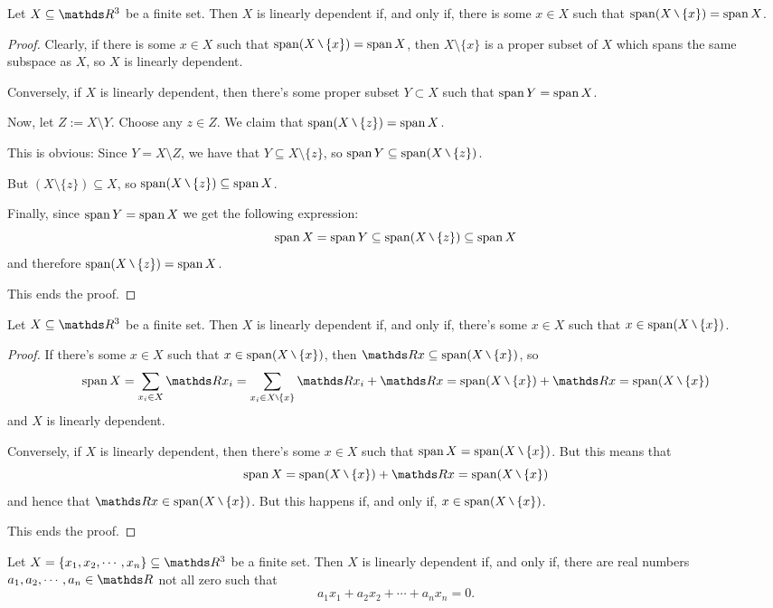 \begin{lemma}
	Let $X\subseteq \R^3$ be a finite set. Then $X$ is linearly dependent if, and only if, there is some $x\in X$ such that $\spen(X\setminus\{x\})=\spen X$.
\end{lemma}
\begin{proof}
	Clearly, if there is some $x\in X$ such that $\spen(X\setminus\{x\})=\spen X$, then $X\setminus\{x\}$ is a proper subset of $X$ which spans the same subspace as $X$, so $X$ is linearly dependent.
	
	\bigskip
	Conversely, if $X$ is linearly dependent, then there's some proper subset $Y\subset X$ such that $\operatorname{span} Y=\operatorname{span} X$.
	
	Now, let $Z:=X\setminus Y$. Choose any $z\in Z$. We claim that $\spen (X\setminus \{z\})=\spen X$.
	
	This is obvious: Since $Y=X\setminus Z$, we have that $Y\subseteq X\setminus \{z\}$, so $\spen Y\subseteq \spen(X\setminus \{z\})$.
	
	But $(X\setminus\{z\})\subseteq X$, so $\spen(X\setminus\{z\})\subseteq\spen X$.
	
	Finally, since $\operatorname{span} Y=\operatorname{span} X$ we get the following expression:
	\[\spen X=\spen Y\subseteq \spen(X\setminus\{z\})\subseteq\spen X\]and therefore $\spen (X\setminus\{z\})=\spen X$.
	
	This ends the proof.
\end{proof}
\begin{cor}
	Let $X\subseteq\R^3$ be a finite set. Then $X$ is linearly dependent if, and only if, there's some $x\in X$ such that $x\in \spen(X\setminus\{x\})$.
\end{cor}
\begin{proof}
	If there's some $x\in X$ such that $x\in \spen(X\setminus\{x\})$, then $\R x\subseteq \spen(X\setminus\{x\})$, so
	\[\spen X=\sum_{x_i\in X}\R x_i=\sum_{x_i\in X\setminus \{x\}}\R x_i+\R x=\spen(X\setminus \{x\})+\R x=\spen (X\setminus \{x\})\]and $X$ is linearly dependent.
	
	\bigskip
	Conversely, if $X$ is linearly dependent, then there's some $x\in X$ such that $\spen X=\spen(X\setminus\{x\})$. But this means that
	\[\spen X=\spen(X\setminus \{x\})+\R x=\spen (X\setminus \{x\})\]and hence that $\R x\in \spen(X\setminus\{x\})$. But this happens if, and only if, $x\in \spen (X\setminus \{x\})$.
	
	This ends the proof.
\end{proof}
\begin{cor}
	Let $X=\{x_1,x_2,\cdots,x_n\}\subseteq\R^3$ be a finite set. Then $X$ is linearly dependent if, and only if, there are real numbers $a_1,a_2,\cdots,a_n\in \R$ not all zero such that
	\[a_1x_1+a_2x_2+\cdots+a_nx_n=0.\]
\end{cor}

